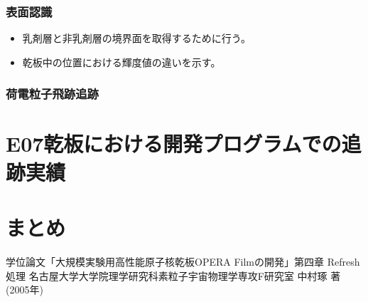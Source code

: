 \documentclass[12pt,a4paper]{jarticle}
\begin{document}
\subsubsection{表面認識}
\begin{itemize}
    \item 乳剤層と非乳剤層の境界面を取得するために行う。
    \item 乾板中の位置における輝度値の違いを示す。
\end{itemize}
\subsubsection{荷電粒子飛跡追跡}

\newpage
\section{E07乾板における開発プログラムでの追跡実績}

\newpage
\section{まとめ}

\begin{thebibliography}{99}
 学位論文「大規模実験用高性能原子核乾板OPERA Filmの開発」第四章 Refresh処理 名古屋大学大学院理学研究科素粒子宇宙物理学専攻F研究室 中村琢 著(2005年)
\end{thebibliography}
\end{document}

